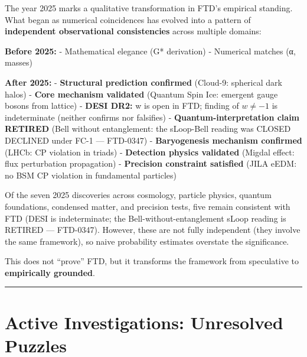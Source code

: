 \documentclass[
  11pt,
  letterpaper,
  twoside,
  openright]{book}
\begin{document}
\begin{tcolorbox}[enhanced jigsaw, coltitle=black, colbacktitle=quarto-callout-note-color!10!white, toprule=.15mm, colframe=quarto-callout-note-color-frame, arc=.35mm, opacityback=0, bottomtitle=1mm, toptitle=1mm, breakable, colback=white, titlerule=0mm, opacitybacktitle=0.6, title=\textcolor{quarto-callout-note-color}{\faInfo}\hspace{0.5em}{The Epistemic Situation (Updated 2025)}, rightrule=.15mm, bottomrule=.15mm, leftrule=.75mm, left=2mm]

The year 2025 marks a qualitative transformation in FTD's empirical
standing. What began as numerical coincidences has evolved into a
pattern of \textbf{independent observational consistencies} across
multiple domains:

\textbf{Before 2025:} - Mathematical elegance (G* derivation) -
Numerical matches (α, masses)

\textbf{After 2025:} - \textbf{Structural prediction confirmed}
(Cloud-9: spherical dark halos) - \textbf{Core mechanism validated}
(Quantum Spin Ice: emergent gauge bosons from lattice) - \textbf{DESI
DR2:} w is open in FTD; finding of \(w \neq -1\) is indeterminate
(neither confirms nor falsifies) - \textbf{Quantum-interpretation claim
RETIRED} (Bell without entanglement: the sLoop-Bell reading was CLOSED
DECLINED under FC-1 --- FTD-0347) - \textbf{Baryogenesis mechanism
confirmed} (LHCb: CP violation in triads) - \textbf{Detection physics
validated} (Migdal effect: flux perturbation propagation) -
\textbf{Precision constraint satisfied} (JILA eEDM: no BSM CP violation
in fundamental particles)

Of the seven 2025 discoveries across cosmology, particle physics,
quantum foundations, condensed matter, and precision tests, five remain
consistent with FTD (DESI is indeterminate; the
Bell-without-entanglement sLoop reading is RETIRED --- FTD-0347).
However, these are not fully independent (they involve the same
framework), so naive probability estimates overstate the significance.

This does not ``prove'' FTD, but it transforms the framework from
speculative to \textbf{empirically grounded}.

\end{tcolorbox}

\begin{center}\rule{0.5\linewidth}{0.5pt}\end{center}

\section{Active Investigations: Unresolved
Puzzles}\label{sec-active-investigations}
\end{document}
